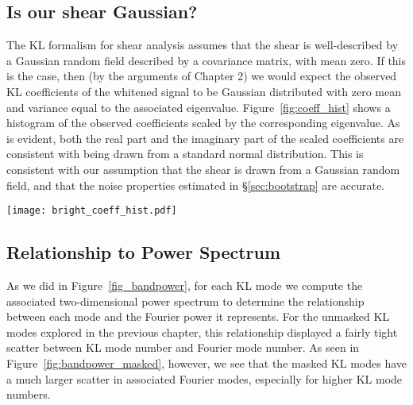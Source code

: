 \subsection{Is our shear Gaussian?}

The KL formalism for shear analysis assumes that the shear is well-described
by a Gaussian random field described by a covariance matrix, with mean
zero.  If this is the case, then (by the arguments of Chapter 2) we would
expect the observed KL coefficients of the whitened signal to be Gaussian
distributed with zero mean and variance equal to the associated eigenvalue.
Figure~\ref{fig:coeff_hist} shows a histogram of the observed coefficients
scaled by the corresponding eigenvalue.  As is evident, both the real
part and the imaginary part of the scaled coefficients are consistent with
being drawn from a standard normal distribution.  This is consistent with
our assumption that the shear is drawn from a Gaussian random field, and
that the noise properties estimated in \S\ref{sec:bootstrap} are accurate.

\begin{figure*}
 \centering
 \texttt{[image: bright\_coeff\_hist.pdf]}
 \caption{
   The histogram of normalized coefficients $a_i / \sqrt{\lambda_i}$.
   If the shear is truly a Gaussian random field, this distribution should
   be a Gaussian with unit variance.
   \label{fig:coeff_hist}}
\end{figure*}

\subsection{Relationship to Power Spectrum}
As we did in Figure~\ref{fig_bandpower}, for each KL mode we compute the
associated two-dimensional power spectrum to determine the relationship
between each mode and the Fourier power it represents.  For the unmasked
KL modes explored in the previous chapter, this relationship displayed a
fairly tight scatter between KL mode number and Fourier mode number.
As seen in Figure~\ref{fig:bandpower_masked}, however, we see that the
masked KL modes have a much larger scatter in associated Fourier modes,
especially for higher KL mode numbers.

